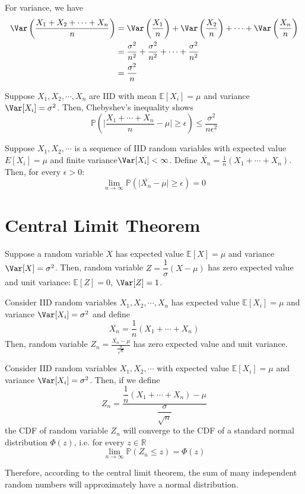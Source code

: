 For variance, we have 
\[
        \begin{aligned}
            \Var\left(\dfrac{X_1 + X_2 + \cdots + X_n}{n}\right) &= \Var\left(\dfrac{X_1}{n}\right) + \Var\left(\dfrac{X_2}{n}\right) + \cdots + \Var\left(\dfrac{X_n}{n}\right) \\
            &= \dfrac{\sigma^2}{n^2} + \dfrac{\sigma^2}{n^2} + \cdots + \dfrac{\sigma^2}{n^2} \\
            &= \dfrac{\sigma^2}{n}
        \end{aligned}
    \]


Suppose \(X_1, X_2, \cdots, X_n\) are IID with mean \(\mathbb{E}[X_i] = \mu\) and variance \(\Var[X_i] = \sigma^2\). Then, Chebyshev's inequality shows 
\[
        \mathbb{P}\left(\vert \dfrac{X_1 + \cdots + X_n}{n} - \mu \vert \geq \epsilon \right) \leq \dfrac{\sigma^2}{n\epsilon^2}
\]

\newpage
\begin{theorem}
    Suppose \(X_1, X_2, \cdots\) is a sequence of IID random variables with expected value \(E[X_i] = \mu\) and finite variance\(\Var[X_i] < \infty\). Define \(\overline{X_n} = \frac{1}{n}(X_1 + \cdots + X_n)\). Then, for every \(\epsilon > 0\):
    \[
        \lim_{n \to \infty} \mathbb{P}(\vert \overline{X_n} - \mu \vert \geq \epsilon) = 0
    \]
\end{theorem}

\section{Central Limit Theorem}
Suppose a random variable \(X\) has expected value \(\mathbb{E}[X] = \mu\) and variance \(\Var[X] = \sigma^2\). Then, random variable \(Z = \dfrac{1}{\sigma} (X - \mu)\) has zero expected value and unit variance: \(\mathbb{E}[Z] = 0\), \(\Var[Z] = 1\). 

Consider IID random variables \(X_1, X_2, \cdots, X_n\) has expected value \(\mathbb{E}[X_i] = \mu\) and variance \(\Var[X_i] = \sigma^2\) and define
\[
    \overline{X_n} = \dfrac{1}{n}(X_1 + \cdots + X_n) 
\]
Then, random variable \(Z_n = \frac{\overline{X_n} - \mu}{\frac{\sigma}{\sqrt{n}}}\) has zero expected value and unit variance. 

\begin{theorem}
    Consider IID random variables \(X_1, X_2, \cdots\) with expected value \(\mathbb{E}[X_i] = \mu\) and variance \(\Var[X_i] = \sigma^2\). Then, if we define
    \[
        Z_n = \dfrac{\dfrac{1}{n}(X_1 + \cdots + X_n) - \mu}{\dfrac{\sigma}{\sqrt{n}}}
    \]
    the CDF of random variable \(Z_n\) will converge to the CDF of a standard normal distribution \(\varPhi (z)\), i.e. for every \(z \in \mathbb{R}\)
    \[
        \lim_{n \to \infty} \mathbb{P}(Z_n \leq z) = \varPhi (z)
    \]
\end{theorem}
Therefore, according to the central limit theorem, the sum of many independent random numbers will approximately have a normal distribution.